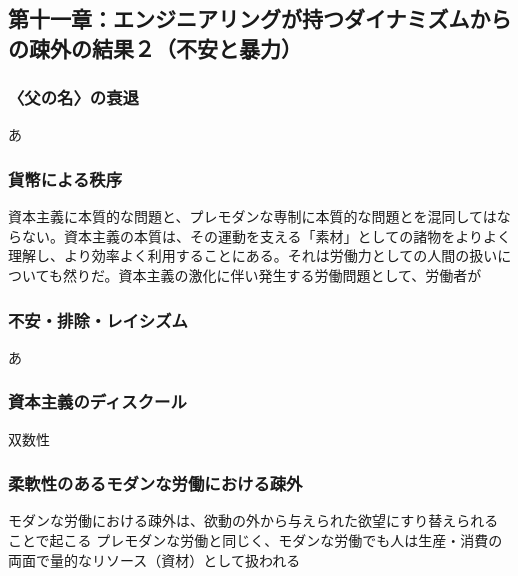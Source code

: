 \subsection{第十一章：エンジニアリングが持つダイナミズムからの疎外の結果２（不安と暴力）}\label{ux7b2cux5341ux4e00ux7ae0ux30a8ux30f3ux30b8ux30cbux30a2ux30eaux30f3ux30b0ux304cux6301ux3064ux30c0ux30a4ux30caux30dfux30baux30e0ux304bux3089ux306eux758eux5916ux306eux7d50ux679cuxff12ux4e0dux5b89ux3068ux66b4ux529b}

\subsubsection{〈父の名〉の衰退}\label{ux7236ux306eux540dux306eux8870ux9000}

あ

\subsubsection{貨幣による秩序}\label{ux8ca8ux5e63ux306bux3088ux308bux79e9ux5e8f}

資本主義に本質的な問題と、プレモダンな専制に本質的な問題とを混同してはならない。資本主義の本質は、その運動を支える「素材」としての諸物をよりよく理解し、より効率よく利用することにある。それは労働力としての人間の扱いについても然りだ。資本主義の激化に伴い発生する労働問題として、労働者が

\subsubsection{不安・排除・レイシズム}\label{ux4e0dux5b89ux6392ux9664ux30ecux30a4ux30b7ux30baux30e0}

あ

\subsubsection{資本主義のディスクール}\label{ux8cc7ux672cux4e3bux7fa9ux306eux30c7ux30a3ux30b9ux30afux30fcux30eb}

双数性

\subsubsection{柔軟性のあるモダンな労働における疎外}\label{ux67d4ux8edfux6027ux306eux3042ux308bux30e2ux30c0ux30f3ux306aux52b4ux50cdux306bux304aux3051ux308bux758eux5916}

モダンな労働における疎外は、欲動の外から与えられた欲望にすり替えられることで起こる
プレモダンな労働と同じく、モダンな労働でも人は生産・消費の両面で量的なリソース（資材）として扱われる

